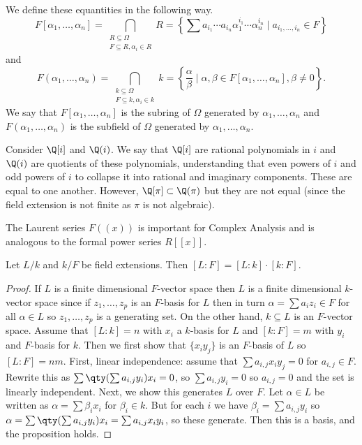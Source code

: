 We define these equantities in the following way. 
\[ F[\alpha_1, \dotsc, \alpha_n] = \bigcap_{\substack{R \subseteq \Omega \\ F \subseteq R, \alpha_i \in R}} R = \left\{\sum a_{i_1} \cdots a_{i_n}\alpha_1^{i_1} \cdots \alpha_n^{i_n} \mid a_{i_1,\dotsc,i_n} \in F\right\} \]
and 
\[ 
	F(\alpha_1, \dotsc, \alpha_n) = \bigcap_{\substack{k \subseteq \Omega \\ F \subseteq k, \alpha_i \in k}} k = 
	\left\{
		\frac{\alpha}{\beta} \mid \alpha,\beta \in F[\alpha_1, \dotsc, \alpha_n], \beta \not= 0
	\right\}.
\]
We say that $F[\alpha_1, \dotsc, \alpha_n]$ is the subring of $\Omega$ generated by $\alpha_1, \dotsc, \alpha_n$ and $F(\alpha_1, \dotsc, \alpha_n)$ is the subfield of $\Omega$ generated by $\alpha_1, \dotsc, \alpha_n$.

\begin{example}
Consider $\Q[i]$ and $\Q(i)$. We say that $\Q[i]$ are rational polynomials in $i$ and $\Q(i)$ are quotients of these polynomials, understanding that even powers of $i$ and odd powers of $i$ to collapse it into rational and imaginary components. These are equal to one another. However, $\Q[\pi] \subset \Q(\pi)$ but they are not equal (since the field extension is not finite as $\pi$ is not algebraic).
\end{example}

The Laurent series $F((x))$ is important for Complex Analysis and is analogous to the formal power series $R[[x]]$.

\begin{theorem}
Let $L/k$ and $k/F$ be field extensions. Then $[L : F] = [L : k] \cdot [k : F]$.
\end{theorem}

\begin{proof}
If $L$ is a finite dimensional $F$-vector space then $L$ is a finite dimensional $k$-vector space since if $z_1,\dotsc,z_p$ is an $F$-basis for $L$ then in turn $\alpha = \sum a_iz_i \in F $ for all $\alpha \in L$ so $z_1,\dotsc,z_p$ is a generating set. On the other hand, $k \subseteq L$ is an $F$-vector space. Assume that $[L : k] = n$ with $x_i$ a $k$-basis for $L$ and $[k : F] = m$ with $y_i$ and $F$-basis for $k$. Then we first show that $\{x_iy_j\}$ is an $F$-basis of $L$ so $[L:F] = nm$. First, linear independence: assume that $\sum a_{i,j}x_iy_j = 0$ for $a_{i,j} \in F$. Rewrite this as $\sum\qty(\sum a_{i,j}y_i)x_i = 0$, so $\sum a_{i,j}y_i = 0$ so $a_{i,j} = 0$ and the set is linearly independent. Next, we show this generates $L$ over $F$. Let $\alpha \in L$ be written as $\alpha = \sum \beta_ix_i$ for $\beta_i \in k$. But for each $i$ we have $\beta_i = \sum a_{i,j}y_i$ so $\alpha = \sum\qty(\sum a_{i,j}y_i)x_i = \sum a_{i,j}x_iy_i$, so these generate. Then this is a basis, and the proposition holds.
\end{proof}